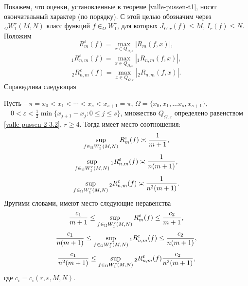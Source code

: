 Покажем, что оценки, установленные в теореме \ref{valle-pussen-t1}, носят окончательный характер (по порядку). С этой целью обозначим через ${}_\Omega W^r_1(M,N)$ класс функций $f\in_\Omega W^r_1$, для которых $J_{\Omega,r}(f)\le M$, $I_r(f)\le N$. Положим
 $$
 R_m^\varepsilon(f)=\max_{x\in Q_{\Omega,\varepsilon}}|R_{m}(f,x)|,
 $$
 $$
 _1 R_{n,m}^\varepsilon(f)=\max_{x\in Q_{\Omega,\varepsilon}}|_1R_{n,m}(f,x)|,
 $$
 $$
 _2 R_{n,m}^\varepsilon(f)=\max_{x\in Q_{\Omega,\varepsilon}}|_2R_{n,m}(f,x)|.
 $$
 Справедлива следующая
\begin{theorem}
 Пусть $-\pi=x_0<x_1<\cdots<x_s<x_{s+1}=\pi$, $\Omega=\{x_0,x_1,\ldots x_s,x_{s+1}\}$,  $\quad 0<\varepsilon<\frac12\min\{x_{j+1}-x_{j}:0\le j\le s\}$, множество $Q_{\Omega,\varepsilon}$ определено равенством \eqref{valle-pussen-2-3.2}, $r\ge4$. Тогда имеет место соотношения:
$$
\sup_{f\in{}_\Omega W^r_1(M,N) }R_m^\varepsilon(f)\asymp{1\over m+1},
$$
$$
\sup_{f\in {}_\Omega W^r_1(M,N)} {}_1R_{n,m}^\varepsilon(f)\asymp{1\over n(m+1)},
$$
$$
\sup_{f\in{}_\Omega W^r_1(M,N) } {}_2R_{n,m}^\varepsilon(f)\asymp{1\over n^2(m+1)}.
$$
Другими словами, имеют место следующие неравенства
\begin{equation}\label{valle-pussen-2-3.9}
{c_1\over m+1}\le\sup_{f\in{}_\Omega W^r_1(M,N) }R_m^\varepsilon(f)\le{c_2\over m+1},
\end{equation}
\begin{equation}\label{valle-pussen-2-3.10}
{c_1\over n(m+1)}\le\sup_{f\in {}_\Omega W^r_1(M,N)} {}_1R_{n,m}^\varepsilon(f)\le{c_2\over n(m+1)},
\end{equation}
\begin{equation}\label{valle-pussen-2-3.11}
{c_1\over n^2(m+1)}\le\sup_{f\in{}_\Omega W^r_1(M,N) } {}_2R_{n,m}^\varepsilon(f){c_2\over n^2(m+1)},
\end{equation}
где $c_i=c_i(r,\varepsilon,M,N)$.
\end{theorem} 